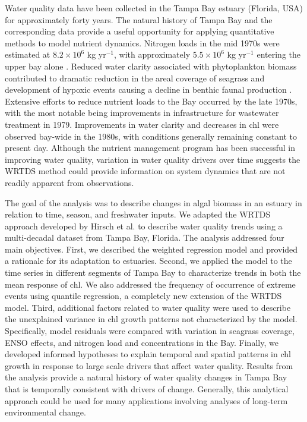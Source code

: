 \documentclass{svjour3}\usepackage[]{graphicx}\usepackage[]{color}
\begin{document}
Water quality data have been collected in the Tampa Bay estuary (Florida, USA) for approximately forty years.  The natural history of Tampa Bay and the corresponding data provide a useful opportunity for applying quantitative methods to model nutrient dynamics. Nitrogen loads in the mid 1970s were estimated at $8.2 \times 10^6$ kg yr$^{-1}$, with approximately $5.5 \times 10^6$ kg yr$^{-1}$ entering the upper bay alone \cite{Poe05,Greening06}.  Reduced water clarity associated with phytoplankton biomass contributed to dramatic reduction in the areal coverage of seagrass \cite{Tomasko05} and development of hypoxic events causing a decline in benthic faunal production \cite{Santos80}.  Extensive efforts to reduce nutrient loads to the Bay occurred by the late 1970s, with the most notable being improvements in infrastructure for wastewater treatment in 1979.  Improvements in water clarity and decreases in \ac{chl} were observed bay-wide in the 1980s, with conditions generally remaining constant to present day. Although the nutrient management program has been successful in improving water quality, variation in water quality drivers over time suggests the \ac{WRTDS} method could provide information on system dynamics that are not readily apparent from observations.

The goal of the analysis was to describe changes in algal biomass in an estuary in relation to time, season, and freshwater inputs.  We adapted the \ac{WRTDS} approach developed by Hirsch et al. \cite{Hirsch10} to describe water quality trends using a multi-decadal dataset from Tampa Bay, Florida. The analysis addressed four main objectives.  First, we described the weighted regression model and provided a rationale for its adaptation to estuaries.  Second, we applied the model to the time series in different segments of Tampa Bay to characterize trends in both the mean response of \ac{chl}.  We also addressed the frequency of occurrence of extreme events using quantile regression, a completely new extension of the \ac{WRTDS} model.  Third, additional factors related to water quality were used to describe the unexplained variance in \ac{chl} growth patterns not characterized by the model.  Specifically, model residuals were compared with variation in seagrass coverage, \ac{ENSO} effects, and nitrogen load and concentrations in the Bay.  Finally, we developed informed hypotheses to explain temporal and spatial patterns in \ac{chl} growth in response to large scale drivers that affect water quality.  Results from the analysis provide a natural history of water quality changes in Tampa Bay that is temporally consistent with drivers of change.  Generally, this analytical approach could be used for many applications involving analyses of long-term environmental change.  
\end{document}
